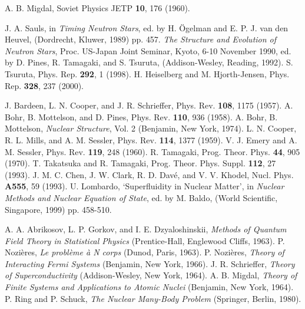 \documentclass[runningheads]{svmult}
\begin{document}
\begin{thebibliography}{}

 A. B. Migdal, 
 Soviet Physics JETP {\bf 10}, 176 (1960).  

 J. A. Sauls, in {\it Timing Neutron Stars}, 
 ed. by H. \"{O}gelman and E. P. J. van den Heuvel,  
 (Dordrecht, Kluwer, 1989) pp. 457.
 {\it The Structure and Evolution of Neutron Stars}, 
 Proc. US-Japan Joint Seminar, Kyoto, 6-10 November 1990,
 ed. by D. Pines, R. Tamagaki, and S. Tsuruta, 
 (Addison-Wesley, Reading, 1992).
 S. Tsuruta,
 Phys. Rep. {\bf 292}, 1 (1998).
 H. Heiselberg and M. Hjorth-Jensen,
 Phys. Rep. {\bf 328}, 237 (2000).

 J. Bardeen, L. N. Cooper, and J. R. Schrieffer,
 Phys. Rev. {\bf108}, 1175 (1957).
 A. Bohr, B. Mottelson, and D. Pines, 
 Phys. Rev. {\bf 110}, 936 (1958).
 A. Bohr, B. Mottelson, 
 {\em Nuclear Structure}, Vol. 2
 (Benjamin, New York, 1974).
 L. N. Cooper, R. L. Mills, and A. M. Sessler, 
 Phys. Rev. {\bf 114}, 1377 (1959).
 V. J. Emery and A. M. Sessler, 
 Phys. Rev. {\bf 119}, 248 (1960).
 R. Tamagaki, 
 Prog. Theor. Phys. {\bf 44}, 905 (1970). 
 T. Takatsuka and R. Tamagaki,
 Prog. Theor. Phys. Suppl. {\bf 112}, 27 (1993).
 J. M. C. Chen, J. W. Clark, R. D. Dav\'e, and V. V. Khodel,
 Nucl. Phys. {\bf A555}, 59 (1993).
 U. Lombardo,
 {`Superfluidity in Nuclear Matter'}, 
 in {\it Nuclear Methods and Nuclear Equation of State}, ed. by M. Baldo, 
 (World Scientific, Singapore, 1999) pp. 458-510.

 A. A. Abrikosov, L. P. Gorkov, and I. E. Dzyaloshinskii,
 {\it Methods of Quantum Field Theory in Statistical Physics}
 (Prentice-Hall, Englewood Cliffs, 1963).
 P. Nozi\`{e}res, 
 {\em Le probl\`{e}me \`{a} N corps}
 (Dunod, Paris, 1963).
 P. Nozi\`{e}res, 
 {\em Theory of Interacting Fermi Systems}
 (Benjamin, New York, 1966).
 J. R. Schrieffer, 
 {\it Theory of Superconductivity}
 (Addison-Wesley, New York, 1964).
 A. B. Migdal, 
 {\it Theory of Finite Systems and Applications to Atomic Nuclei}
 (Benjamin, New York, 1964). 
 P. Ring and P. Schuck,  
 {\em The Nuclear Many-Body Problem}
 (Springer, Berlin, 1980).


\end{thebibliography}
\end{document}
